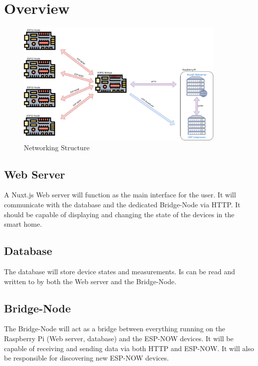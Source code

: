 \section{Overview}

    \begin{figure}[H]
        \centering
        \includegraphics[width=0.9\textwidth]{topics/flowcharts/Networking.png}
        \caption{Networking Structure}
    \end{figure}
    \subsection{Web Server}
    A Nuxt.js Web server will function as the main interface
    for the user. It will communicate with the database and the
    dedicated Bridge-Node via HTTP. It should be capable of displaying
    and changing the state of the devices in the smart home.
    \subsection{Database}
    The database will store device states and measurements.
    Is can be read and written to by both the Web server and the
    Bridge-Node. 
    \subsection{Bridge-Node}
    The Bridge-Node will act as a bridge between everything running
    on the Raspberry Pi (Web server, database) and the ESP-NOW devices.
    It will be capable of receiving and sending data via both HTTP and
    ESP-NOW. It will also be responsible for discovering new ESP-NOW
    devices.